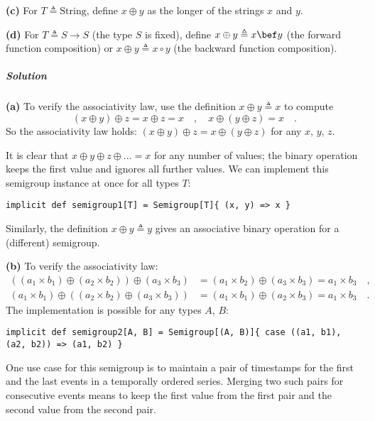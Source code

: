 \textbf{(c)} For $T\triangleq\text{String}$, define $x\oplus y$
as the longer of the strings $x$ and $y$.

\textbf{(d)} For $T\triangleq S\rightarrow S$ (the type $S$ is fixed),
define $x\oplus y\triangleq x\bef y$ (the forward function composition)
or $x\oplus y\triangleq x\circ y$ (the backward function composition).

\subparagraph{Solution}

\textbf{(a)} To verify the associativity law, use the definition $x\oplus y\triangleq x$
to compute 
\[
\left(x\oplus y\right)\oplus z=x\oplus z=x\quad,\quad x\oplus\left(y\oplus z\right)=x\quad.
\]
So the associativity law holds: $\left(x\oplus y\right)\oplus z=x\oplus\left(y\oplus z\right)$
for any $x$, $y$, $z$.

It is clear that $x\oplus y\oplus z\oplus...=x$ for any number of
values; the binary operation keeps the first value and ignores all
further values. We can implement this semigroup instance at once for
all types $T$:
\begin{lstlisting}
implicit def semigroup1[T] = Semigroup[T]{ (x, y) => x }
\end{lstlisting}
Similarly, the definition $x\oplus y\triangleq y$ gives an associative
binary operation for a (different) semigroup.

\textbf{(b)} To verify the associativity law:
\begin{align*}
\left(\left(a_{1}\times b_{1}\right)\oplus\left(a_{2}\times b_{2}\right)\right)\oplus\left(a_{3}\times b_{3}\right) & =\left(a_{1}\times b_{2}\right)\oplus\left(a_{3}\times b_{3}\right)=a_{1}\times b_{3}\quad,\\
\left(a_{1}\times b_{1}\right)\oplus\left(\left(a_{2}\times b_{2}\right)\oplus\left(a_{3}\times b_{3}\right)\right) & =\left(a_{1}\times b_{1}\right)\oplus\left(a_{2}\times b_{3}\right)=a_{1}\times b_{3}\quad.
\end{align*}
The implementation is possible for any types $A$, $B$:
\begin{lstlisting}
implicit def semigroup2[A, B] = Semigroup[(A, B)]{ case ((a1, b1), (a2, b2)) => (a1, b2) }
\end{lstlisting}

One use case for this semigroup is to maintain a pair of timestamps
for the first and the last events in a temporally ordered series.
Merging two such pairs for consecutive events means to keep the first
value from the first pair and the second value from the second pair.

